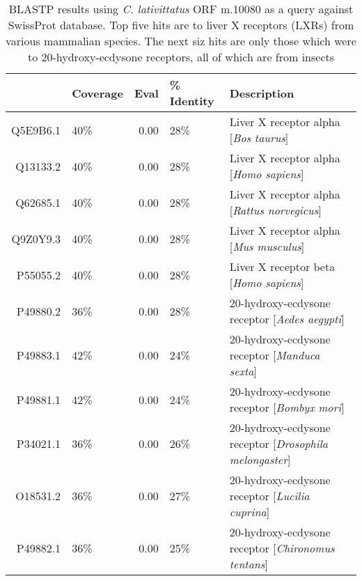\begin{table}[hp]
\caption[BLASTP hits for \textit{C. lat} m.10080]{BLASTP results using \textit{C. lativittatus} ORF m.10080 as a query against SwissProt database. Top five hits are to liver X receptors (LXRs) from various mammalian species. The next siz hits are only those which were to 20-hydroxy-ecdysone receptors, all of which are from insects} 
\label{tab:ChClat_LBD}
\begin{tabular}{rlrll}
  \hline
\hline
 & Coverage & Eval & \% Identity & Description \\ 
  \hline
Q5E9B6.1 & 40\% & 0.00 & 28\% & Liver X receptor alpha [\emph{Bos taurus}] \\ 
  Q13133.2 & 40\% & 0.00 & 28\% & Liver X receptor alpha [\emph{Homo sapiens}] \\ 
  Q62685.1 & 40\% & 0.00 & 28\% & Liver X receptor alpha [\emph{Rattus norvegicus}] \\ 
  Q9Z0Y9.3 & 40\% & 0.00 & 28\% & Liver X receptor alpha [\emph{Mus musculus}] \\ 
  P55055.2 & 40\% & 0.00 & 28\% & Liver X receptor beta [\emph{Homo sapiens}] \\ 
   \hline
P49880.2 & 36\% & 0.00 & 28\% & 20-hydroxy-ecdysone receptor [\emph{Aedes aegypti}] \\ 
  P49883.1 & 42\% & 0.00 & 24\% & 20-hydroxy-ecdysone receptor [\emph{Manduca sexta}] \\ 
  P49881.1 & 42\% & 0.00 & 24\% & 20-hydroxy-ecdysone receptor [\emph{Bombyx mori}] \\ 
  P34021.1 & 36\% & 0.00 & 26\% & 20-hydroxy-ecdysone receptor [\emph{Drosophila melongaster}] \\ 
  O18531.2 & 36\% & 0.00 & 27\% & 20-hydroxy-ecdysone receptor [\emph{Lucilia cuprina}] \\ 
  P49882.1 & 36\% & 0.00 & 25\% & 20-hydroxy-ecdysone receptor [\emph{Chironomus tentans}] \\ 
   \hline
\hline
\end{tabular}
\end{table}
